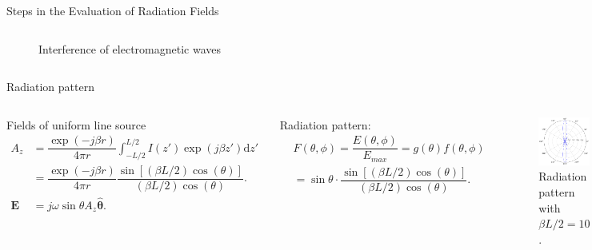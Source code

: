 \begin{frame}{Steps in the Evaluation of Radiation Fields}
\begin{columns}
\begin{figure}
        \caption{Interference of electromagnetic waves}
        \label{fig:Interference}
    \end{figure}
\end{columns}
\end{frame}

\begin{frame}{Radiation pattern}
    \begin{columns}
            Fields of uniform line source
        \begin{align*}
            A_z &= \dfrac{ \exp ( -j \beta r) }{4 \pi r} \int_{-L/2}^{L/2} I(z') \exp( j \beta z') \mathrm{d}z' \\
            &= \dfrac{ \exp ( -j \beta r) }{4 \pi r} \dfrac{\sin [(\beta L/2) \cos (\theta)]}{(\beta L/2) \cos (\theta)}. \\
            \mathbf{E} &= j \omega \sin \theta A_z \mathbf{\hat{\theta}}.
        \end{align*}
        
        Radiation pattern:
        \begin{align*}
            &F(\theta,\phi) = \dfrac{E(\theta,\phi)}{E_{max}} = g(\theta) f(\theta,\phi) \\
            &= \sin \theta \cdot \dfrac{\sin [(\beta L/2) \cos (\theta)]}{(\beta L/2) \cos (\theta)}.
        \end{align*}
        \begin{figure}
            \centering
            \includegraphics[width=\textwidth]{Figures/Radiation_pattern_diagram/Polar_plot.pdf}
            \caption{Radiation pattern with \( \beta L/2 = 10\).}
            \label{fig:Polar_radiation_pattern}
        \end{figure}
    \end{columns}
\end{frame}